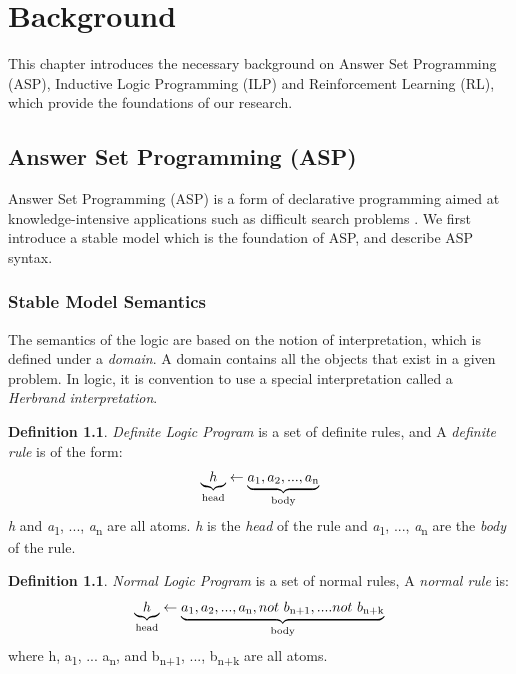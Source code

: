 \documentclass[11pt,twoside]{report}
\theoremstyle{plain}
\theoremstyle{definition}
\newtheorem{defn}[thm]{Definition} %
\begin{document}
\chapter{Background}
\label{background}

This chapter introduces the necessary background on Answer Set Programming (ASP), Inductive Logic Programming (ILP) and Reinforcement Learning (RL), which provide the foundations of our research.

\section{Answer Set Programming (ASP)}
\label{sec:asp}
Answer Set Programming (ASP) is a form of declarative programming aimed at knowledge-intensive applications such as difficult search problems \cite{Lifschitz2008}. 
We first introduce a stable model which is the foundation of ASP, and describe ASP syntax. 

\subsection{Stable Model Semantics}

The semantics of the logic are based on the notion of interpretation, which is defined under a \textit{domain}. A domain contains all the objects that exist in a given problem. 
In logic, it is convention to use a special interpretation called a \textit{Herbrand interpretation}.

\begin{defn}
\label{def:definite_logic_program}
\textit{Definite Logic Program} is a set of definite rules, and  
A \textit{definite rule} is of the form: 
\begin{equation}
\label{definite_rule}
\begin{split}
\underbrace{h}_\text{head} \leftarrow\underbrace{ a\textsubscript{1}, a\textsubscript{2}, ..., a\textsubscript{n}}_\text{body}
\end{split}
\end{equation}
\textit{h} and  \textit{a}\textsubscript{1}, ..., \textit{a}\textsubscript{n} are all atoms. \textit{h} is the \textit{head} of the rule and \textit{a}\textsubscript{1}, ..., \textit{a}\textsubscript{n} are the \textit{body} of the rule.
\end{defn}

\begin{defn}
\label{def:normal_logic_program}
\textit{Normal Logic Program} is a set of normal rules,
A \textit{normal rule} is: 
\begin{equation}
\label{normal_rule}
\begin{split}
\underbrace{h}_\text{head} \leftarrow\underbrace{ a\textsubscript{1}, a\textsubscript{2}, ..., a\textsubscript{n}, not \ b\textsubscript{n+1}, ....not \ b\textsubscript{n+k}}_\text{body}
\end{split}
\end{equation}
where h, a\textsubscript{1}, ... a\textsubscript{n}, and b\textsubscript{n+1}, ..., b\textsubscript{n+k} are all atoms.
\end{defn}
\end{document}
